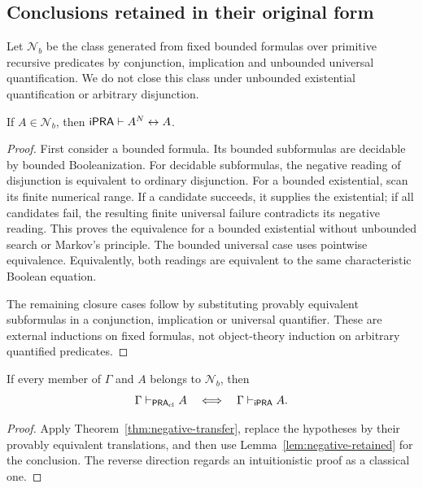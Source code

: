 \subsection{Conclusions retained in their original form}

\begin{definition}
\label{def:retained}
Let \(\mathcal N_b\) be the class generated from fixed bounded formulas
over primitive recursive predicates by conjunction, implication and
unbounded universal quantification. We do not close this class under
unbounded existential quantification or arbitrary disjunction.
\end{definition}

\begin{lemma}
\label{lem:negative-retained}
If \(A\in\mathcal N_b\), then
\(\mathsf{iPRA}\vdash A^N\leftrightarrow A\).
\end{lemma}

\begin{proof}
First consider a bounded formula. Its bounded subformulas are decidable by
bounded Booleanization. For decidable subformulas, the negative reading of
disjunction is equivalent to ordinary disjunction. For a bounded existential,
scan its finite numerical range. If a candidate succeeds, it supplies the
existential; if all candidates fail, the resulting finite universal failure
contradicts its negative reading. This proves the equivalence for a bounded
existential without unbounded search or Markov's principle. The bounded
universal case uses pointwise equivalence. Equivalently, both readings are
equivalent to the same characteristic Boolean equation.

The remaining closure cases follow by substituting provably equivalent
subformulas in a conjunction, implication or universal quantifier. These
are external inductions on fixed formulas, not object-theory induction on
arbitrary quantified predicates.
\end{proof}

\begin{proposition}
\label{prop:negative-conservation}
If every member of \(\Gamma\) and \(A\) belongs to \(\mathcal N_b\), then
\[
 \Gamma\vdash_{\mathsf{PRA}_{\mathrm{cl}}} A
 \quad\Longleftrightarrow\quad
 \Gamma\vdash_{\mathsf{iPRA}} A.
\]
\end{proposition}

\begin{proof}
Apply Theorem~\ref{thm:negative-transfer}, replace the hypotheses by their
provably equivalent translations, and then use
Lemma~\ref{lem:negative-retained} for the conclusion. The reverse direction
regards an intuitionistic proof as a classical one.
\end{proof}

